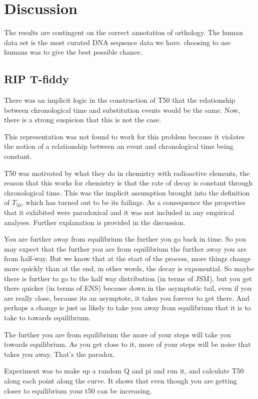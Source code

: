 \chapter{Discussion}

The results are contingent on the correct annotation of orthology. The human data set is the most curated DNA sequence data we have. choosing to use humans was to give the best possible chance.

\section{RIP T-fiddy}

There was an implicit logic in the construction of T50 that the relationship between chronological time and substitution events would be the same. Now, there is a strong suspicion that this is not the case. 

This representation was not found to work for this problem because it violates the notion of a relationship between an event and chronological time being constant. 

T50 was motivated by what they do in chemistry with radioactive elements, the reason that this works for chemistry is that the rate of decay is constant through chronological time. This was the implicit assumption brought into the definition of $T_{50}$, which has turned out to be its failings. As a consequence the properties that it exhibited were paradoxical and it was not included in any empirical analyses. Further explanation is provided in the discussion. 


You are further away from equilibrium the further you go back in time. So you may expect that the further you are from equilibrium the further away you are from half-way. But we know that at the start of the process, more things change more quickly than at the end, in other words, the decay is exponential. So maybe there is further to go to the half way distribution (in terms of JSM), but you get there quicker (in terms of ENS) because down in the asymptotic tail, even if you are really close, because its an asymptote, it takes you forever to get there. And perhaps a change is just as likely to take you away from equilibrium that it is to take to towards equilibrium. 

The further you are from equilibrium the more of your steps will take you towards equilibrium.  As you get close to it, more of your steps will be noise that takes you away. That's the paradox. 

Experiment was to make up a random Q and pi and run it, and calculate T50 along each point along the curve. It shows that even though you are getting closer to equilibrium your t50 can be increasing. 

